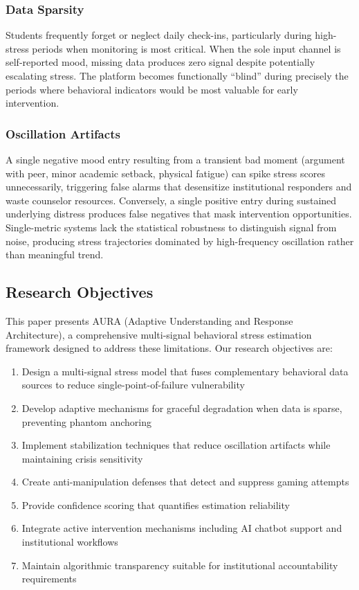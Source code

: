 \documentclass[journal]{IEEEtran}
\begin{document}
\subsubsection{Data Sparsity}
Students frequently forget or neglect daily check-ins, particularly during high-stress periods when monitoring is most critical. When the sole input channel is self-reported mood, missing data produces zero signal despite potentially escalating stress. The platform becomes functionally ``blind'' during precisely the periods where behavioral indicators would be most valuable for early intervention.

\subsubsection{Oscillation Artifacts}
A single negative mood entry resulting from a transient bad moment (argument with peer, minor academic setback, physical fatigue) can spike stress scores unnecessarily, triggering false alarms that desensitize institutional responders and waste counselor resources. Conversely, a single positive entry during sustained underlying distress produces false negatives that mask intervention opportunities. Single-metric systems lack the statistical robustness to distinguish signal from noise, producing stress trajectories dominated by high-frequency oscillation rather than meaningful trend.

\subsection{Research Objectives}

This paper presents AURA (Adaptive Understanding and Response Architecture), a comprehensive multi-signal behavioral stress estimation framework designed to address these limitations. Our research objectives are:

\begin{enumerate}
    \item Design a multi-signal stress model that fuses complementary behavioral data sources to reduce single-point-of-failure vulnerability
    \item Develop adaptive mechanisms for graceful degradation when data is sparse, preventing phantom anchoring
    \item Implement stabilization techniques that reduce oscillation artifacts while maintaining crisis sensitivity
    \item Create anti-manipulation defenses that detect and suppress gaming attempts
    \item Provide confidence scoring that quantifies estimation reliability
    \item Integrate active intervention mechanisms including AI chatbot support and institutional workflows
    \item Maintain algorithmic transparency suitable for institutional accountability requirements
\end{enumerate}
\end{document}
